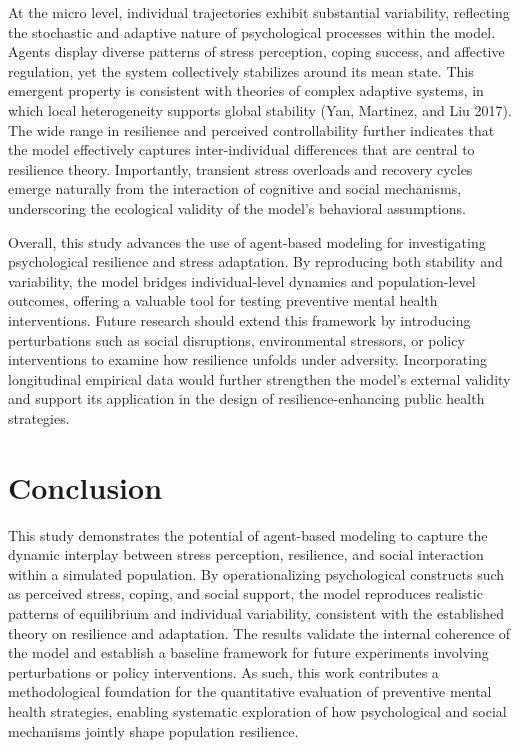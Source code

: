 \documentclass[
  letterpaper,
  DIV=11,
  numbers=noendperiod]{scrartcl}
\begin{document}
At the micro level, individual trajectories exhibit substantial
variability, reflecting the stochastic and adaptive nature of
psychological processes within the model. Agents display diverse
patterns of stress perception, coping success, and affective regulation,
yet the system collectively stabilizes around its mean state. This
emergent property is consistent with theories of complex adaptive
systems, in which local heterogeneity supports global stability (Yan,
Martinez, and Liu 2017). The wide range in resilience and perceived
controllability further indicates that the model effectively captures
inter-individual differences that are central to resilience theory.
Importantly, transient stress overloads and recovery cycles emerge
naturally from the interaction of cognitive and social mechanisms,
underscoring the ecological validity of the model's behavioral
assumptions.

Overall, this study advances the use of agent-based modeling for
investigating psychological resilience and stress adaptation. By
reproducing both stability and variability, the model bridges
individual-level dynamics and population-level outcomes, offering a
valuable tool for testing preventive mental health interventions. Future
research should extend this framework by introducing perturbations such
as social disruptions, environmental stressors, or policy interventions
to examine how resilience unfolds under adversity. Incorporating
longitudinal empirical data would further strengthen the model's
external validity and support its application in the design of
resilience-enhancing public health strategies.

\section{Conclusion}\label{conclusion}

This study demonstrates the potential of agent-based modeling to capture
the dynamic interplay between stress perception, resilience, and social
interaction within a simulated population. By operationalizing
psychological constructs such as perceived stress, coping, and social
support, the model reproduces realistic patterns of equilibrium and
individual variability, consistent with the established theory on
resilience and adaptation. The results validate the internal coherence
of the model and establish a baseline framework for future experiments
involving perturbations or policy interventions. As such, this work
contributes a methodological foundation for the quantitative evaluation
of preventive mental health strategies, enabling systematic exploration
of how psychological and social mechanisms jointly shape population
resilience.
\end{document}
